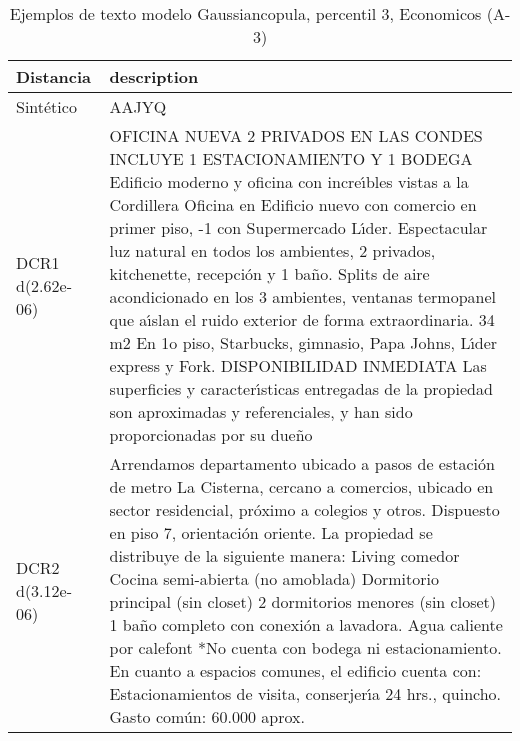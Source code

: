 \begin{table}[H]
\centering
\fontsize{10}{14}\selectfont
\caption{Ejemplos de texto modelo Gaussiancopula, percentil 3, Economicos (A-3)}
\label{table-example-economicos-a-3-gaussiancopula-3p-text}
\begin{tabular}{|l|m{35em}|}
\hline
\rowcolor[gray]{0.8}
Distancia & description \\
\hline Sintético & AAJYQ \\
\hline DCR1 d(2.62e-06) & OFICINA NUEVA 2 PRIVADOS EN LAS CONDES INCLUYE 1 ESTACIONAMIENTO Y 1 BODEGA  Edificio moderno y oficina con incre{\'\i}bles vistas a la Cordillera  Oficina en Edificio nuevo con comercio en primer piso, -1 con Supermercado L{\'\i}der. Espectacular luz natural en todos los ambientes, 2 privados, kitchenette, recepci\'on y 1 ba\~no. Splits de aire acondicionado en los 3 ambientes, ventanas termopanel que a{\'\i}slan el ruido exterior de forma extraordinaria.  34 m2  En 1o piso, Starbucks, gimnasio, Papa Johns, L{\'\i}der express y Fork.   DISPONIBILIDAD INMEDIATA   Las superficies y caracter{\'\i}sticas entregadas de la propiedad son aproximadas y referenciales, y han sido proporcionadas por su due\~no \\
\hline DCR2 d(3.12e-06) & Arrendamos departamento ubicado a pasos de estaci\'on de metro La Cisterna, cercano a comercios, ubicado en sector residencial, pr\'oximo a colegios y otros.  Dispuesto en piso 7, orientaci\'on oriente.  La propiedad se distribuye de la siguiente manera:  Living comedor Cocina semi-abierta (no amoblada) Dormitorio principal (sin closet) 2 dormitorios menores (sin closet) 1 ba\~no completo con conexi\'on a lavadora. Agua caliente por calefont  *No cuenta con bodega ni estacionamiento.  En cuanto a espacios comunes, el edificio cuenta con:  Estacionamientos de visita, conserjer{\'\i}a 24 hrs., quincho.  Gasto com\'un: 60.000 aprox. \\
\hline
\end{tabular}
\end{table}

